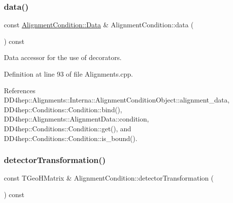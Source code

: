 \hypertarget{class_d_d4hep_1_1_alignments_1_1_alignment_condition_a1c02ce4a7860dd99cd29f37e9858255b}{}\label{class_d_d4hep_1_1_alignments_1_1_alignment_condition_a1c02ce4a7860dd99cd29f37e9858255b} 
\subsubsection{\texorpdfstring{data()}{data()}\hspace{0.1cm}{\footnotesize\ttfamily [2/2]}}
{\footnotesize\ttfamily const \hyperlink{class_d_d4hep_1_1_alignments_1_1_alignment_condition_a6fcd9bd0e9ac67afcf43270cbd9e9983}{Alignment\+Condition\+::\+Data} \& Alignment\+Condition\+::data (\begin{DoxyParamCaption}{ }\end{DoxyParamCaption}) const}



Data accessor for the use of decorators. 



Definition at line 93 of file Alignments.\+cpp.



References D\+D4hep\+::\+Alignments\+::\+Interna\+::\+Alignment\+Condition\+Object\+::alignment\+\_\+data, D\+D4hep\+::\+Conditions\+::\+Condition\+::bind(), D\+D4hep\+::\+Alignments\+::\+Alignment\+Data\+::condition, D\+D4hep\+::\+Conditions\+::\+Condition\+::get(), and D\+D4hep\+::\+Conditions\+::\+Condition\+::is\+\_\+bound().

\hypertarget{class_d_d4hep_1_1_alignments_1_1_alignment_condition_a6c11f62a61a9cab323fdf5832d5d8578}{}\label{class_d_d4hep_1_1_alignments_1_1_alignment_condition_a6c11f62a61a9cab323fdf5832d5d8578} 
\subsubsection{\texorpdfstring{detector\+Transformation()}{detectorTransformation()}}
{\footnotesize\ttfamily const T\+Geo\+H\+Matrix \& Alignment\+Condition\+::detector\+Transformation (\begin{DoxyParamCaption}{ }\end{DoxyParamCaption}) const}



